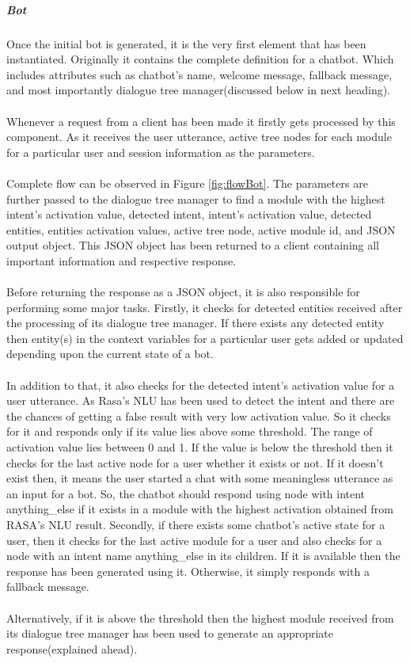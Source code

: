 \subparagraph*{Bot} Once the initial bot is generated, it is the very first element that has been instantiated. Originally it contains the complete definition for a chatbot. Which includes attributes such as chatbot's name, welcome message, fallback message, and most importantly dialogue tree manager(discussed below in next heading).
\\~\\
Whenever a request from a client has been made it firstly gets processed by this component. As it receives the user utterance, active tree nodes for each module for a particular user and session information as the parameters. 
\\~\\
Complete flow can be observed in Figure \ref{fig:flowBot}. The parameters are further passed to the dialogue tree manager to find a module with the highest intent's activation value, detected intent, intent's activation value, detected entities, entities activation values, active tree node, active module id, and JSON output object. This JSON object has been returned to a client containing all important information and respective response.
\\~\\
Before returning the response as a JSON object, it is also responsible for performing some major tasks. Firstly, it checks for detected entities received after the processing of its dialogue tree manager. If there exists any detected entity then entity(s) in the context variables for a particular user gets added or updated depending upon the current state of a bot.
\\~\\
In addition to that, it also checks for the detected intent's activation value for a user utterance. As Rasa's NLU has been used to detect the intent and there are the chances of getting a false result with very low activation value. So it checks for it and responds only if its value lies above some threshold. The range of activation value lies between 0 and 1. If the value is below the threshold then it checks for the last active node for a user whether it exists or not. If it doesn't exist then, it means the user started a chat with some meaningless utterance as an input for a bot. So, the chatbot should respond using node with intent anything\_else if it exists in a module with the highest activation obtained from RASA's NLU result. Secondly, if there exists some chatbot's active state for a user, then it checks for the last active module for a user and also checks for a node with an intent name anything\_else in its children. If it is available then the response has been generated using it. Otherwise, it simply responds with a fallback message.
\\~\\
Alternatively, if it is above the threshold then the highest module received from its dialogue tree manager has been used to generate an appropriate response(explained ahead).

